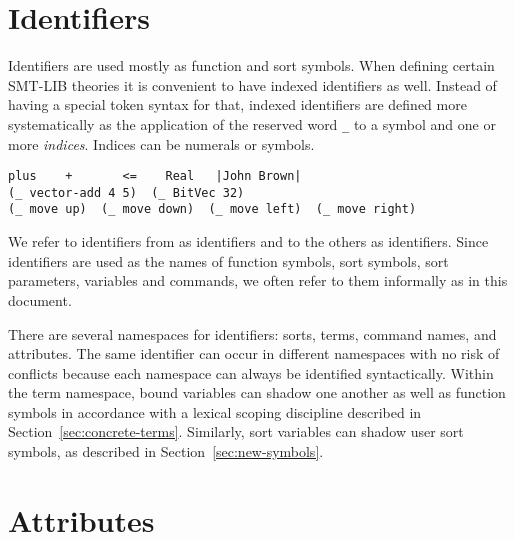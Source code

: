 \section{Identifiers} \label{sec:identifiers}

Identifiers are used mostly as function and sort symbols.
When defining certain SMT-LIB theories 
it is convenient to have indexed identifiers as well.
Instead of having a special token syntax for that,
indexed identifiers are defined more systematically 
as the application of the reserved word \verb+_+
to a symbol and one or more \emph{indices}.
Indices can be numerals or symbols.
\bigskip

\cIdentifiers
\bigskip

\begin{lstlisting}[linewidth=38em]
plus    +       <=    Real   |John Brown|
(_ vector-add 4 5)  (_ BitVec 32)
(_ move up)  (_ move down)  (_ move left)  (_ move right)
\end{lstlisting}

We refer to identifiers from  as  identifiers
and to the others as  identifiers.
Since identifiers are used as the names of function symbols, sort symbols,
sort parameters, variables and commands, we often refer to them informally 
as  in this document.
  
\begin{remark}
There are several namespaces for identifiers:
sorts, terms, command names, and attributes. 
The same identifier can occur in different namespaces with no risk of conflicts
because each namespace can always be identified syntactically.
Within the term namespace, bound variables can shadow one another as well as
function symbols in accordance with a lexical scoping discipline described 
in Section~\ref{sec:concrete-terms}. 
Similarly, sort variables can shadow user sort symbols,
as described in Section~\ref{sec:new-symbols}.
\end{remark}


\section{Attributes}

